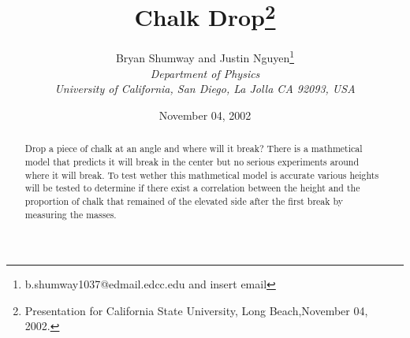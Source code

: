 \documentclass{article}
\begin{document}
\title{Chalk Drop\footnote{
Presentation for California State University, Long Beach,November
04, 2002.}}
\author{Bryan Shumway and Justin Nguyen\thanks{b.shumway1037@edmail.edcc.edu and insert email}\vspace{10pt}\\
{\em Department of Physics}\\
{\em University of California, San Diego, La Jolla CA 92093, USA}}
\date{November 04, 2002}

\maketitle

\thispagestyle{empty}

\begin{abstract}
Drop a piece of chalk at an angle and where will it break? There is a mathmetical model that predicts it will break in the center but no serious experiments around where it will break. To test wether this mathmetical model is accurate various heights will be tested to determine if there exist a correlation between the height and the proportion of chalk that remained of the elevated side after the first break by measuring the masses. 
\end{abstract}
\end{document}
